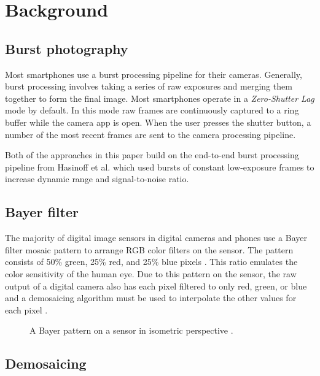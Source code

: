 \documentclass{sig-alternate}
\begin{document}
\section{Background}

\subsection{Burst photography}

Most smartphones use a burst processing pipeline for their cameras. Generally, burst processing involves taking a series of raw exposures and merging them together to form the final image. Most smartphones operate in a \emph{Zero-Shutter Lag} mode by default. In this mode raw frames are continuously captured to a ring buffer while the camera app is open. When the user presses the shutter button, a number of the most recent frames are sent to the camera processing pipeline.

Both of the approaches in this paper build on the end-to-end burst processing pipeline from Hasinoff et al. \cite{Hasinoff2016} which used bursts of constant low-exposure frames to increase dynamic range and signal-to-noise ratio.

\newpage

\subsection{Bayer filter}

The majority of digital image sensors in digital cameras and phones use a Bayer filter mosaic pattern to arrange RGB color filters on the sensor. The pattern consists of 50\% green, 25\% red, and 25\% blue pixels \cite{wiki:BayerFilter}. This ratio emulates the color sensitivity of the human eye. Due to this pattern on the sensor, the raw output of a digital camera also has each pixel filtered to only red, green, or blue and a demosaicing algorithm must be used to interpolate the other values for each pixel \cite{wiki:BayerFilter}.

\begin{figure}
\centering
{}
\caption{A Bayer pattern on a sensor in isometric perspective \cite{wiki:BayerFilter}.}
\label{fig:BayerPattern}
\end{figure}

\subsection{Demosaicing}
\end{document}
